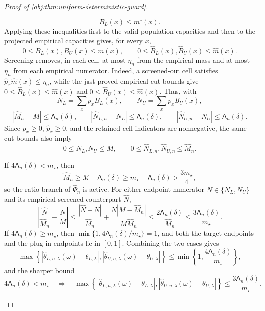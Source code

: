 \begin{proof}[Proof of \cref{obj:thm:uniform-deterministic-guard}]
\begin{enumerate}
\[
B_L^\circ(x)\le m^\circ(x).
\]
Applying these inequalities first to the valid population capacities and then
to the projected empirical capacities gives, for every \(x\),
\[
0\le B_L(x),B_U(x)\le m(x),
\qquad
0\le \widehat B_L(x),\widehat B_U(x)\le \widehat m(x).
\]
Screening removes, in each cell, at most \(\eta_n\) from the empirical mass and
at most \(\eta_n\) from each empirical numerator.  Indeed, a screened-out cell
satisfies \(\widehat p_x\widehat m(x)\le\eta_n\), while the just-proved
empirical cut bounds give
\(0\le \widehat B_L(x)\le\widehat m(x)\) and
\(0\le\widehat B_U(x)\le\widehat m(x)\).  Thus, with
\[
N_L=\sum_x p_xB_L(x),
\qquad
N_U=\sum_x p_xB_U(x),
\]
\[
\left|\widehat M_n-M\right|\le \mathsf A_n(\delta),
\qquad
\left|\widehat N_{L,n}-N_L\right|\le \mathsf A_n(\delta),
\qquad
\left|\widehat N_{U,n}-N_U\right|\le \mathsf A_n(\delta).
\]
Since \(p_x\ge0\), \(\widehat p_x\ge0\), and the retained-cell indicators are
nonnegative, the same cut bounds also imply
\[
0\le N_L,N_U\le M,
\qquad
0\le\widehat N_{L,n},\widehat N_{U,n}\le\widehat M_n.
\]

If \(4\mathsf A_n(\delta)<m_\star\), then
\[
\widehat M_n
\ge
M-\mathsf A_n(\delta)
\ge
m_\star-\mathsf A_n(\delta)
>
\frac{3m_\star}{4},
\]
so the ratio branch of \(\widehat\Psi_n\) is active.  For either endpoint
numerator \(N\in\{N_L,N_U\}\) and its empirical screened counterpart
\(\widehat N\),
\[
\left|
\frac{\widehat N}{\widehat M_n}-\frac{N}{M}
\right|
\le
\frac{|\widehat N-N|}{\widehat M_n}
+
\frac{N|M-\widehat M_n|}{M\widehat M_n}
\le
\frac{2\mathsf A_n(\delta)}{\widehat M_n}
\le
\frac{3\mathsf A_n(\delta)}{m_\star}.
\]
If \(4\mathsf A_n(\delta)\ge m_\star\), then
\(\min\{1,4\mathsf A_n(\delta)/m_\star\}=1\), and both the target endpoints and
the plug-in endpoints lie in \([0,1]\).  Combining the two cases gives
\[
\max\left\{
\left|\widehat\theta_{L,n,\lambda}(\omega)-\theta_{L,\lambda}\right|,
\left|\widehat\theta_{U,n,\lambda}(\omega)-\theta_{U,\lambda}\right|
\right\}
\le
\min\left\{1,\frac{4\mathsf A_n(\delta)}{m_\star}\right\},
\]
and the sharper bound
\[
4\mathsf A_n(\delta)<m_\star
\quad\Longrightarrow\quad
\max\left\{
\left|\widehat\theta_{L,n,\lambda}(\omega)-\theta_{L,\lambda}\right|,
\left|\widehat\theta_{U,n,\lambda}(\omega)-\theta_{U,\lambda}\right|
\right\}
\le
\frac{3\mathsf A_n(\delta)}{m_\star}.
\]


\end{enumerate}
\end{proof}
